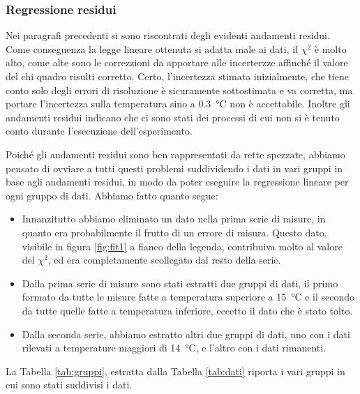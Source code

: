 \subsubsection{Regressione residui}

Nei paragrafi precedenti si sono riscontrati degli evidenti andamenti residui. Come conseguenza la legge lineare ottenuta
si adatta male ai dati, il $\chi^2$ è molto alto, come alte sono le correzzioni da apportare alle incerterzze affinché 
il valore del chi quadro risulti corretto. Certo, l'incertezza stimata inizialmente, che tiene conto solo degli errori di risoluzione
è sicuramente sottostimata e va corretta, ma portare l'incertezza sulla temperatura sino a \SI{0.3}{\celsius} non è accettabile.
Inoltre gli andamenti residui indicano che ci sono stati dei processi di cui non si è tenuto conto durante l'esecuzione dell'esperimento.

Poiché gli andamenti residui sono ben rappresentati da rette spezzate, abbiamo pensato di ovviare a tutti questi problemi suddividendo i
dati in vari gruppi in base agli andamenti residui, in modo da poter eseguire la regressione lineare per ogni gruppo di dati.
Abbiamo fatto quanto segue:

\label{sottoserie}
\begin{itemize}
    \item{Innanzitutto abbiamo eliminato un dato nella prima serie di misure, in quanto era probabilmente il frutto di un
        errore di misura. Questo dato, visibile in figura \ref{fig:fit1} a fianco della legenda,
        contribuiva molto al valore del $\chi^2$, ed era completamente scollegato dal resto della serie.}
    \item{Dalla prima serie di misure sono stati estratti due gruppi di dati, il primo formato da tutte le misure fatte
        a temperatura superiore a \SI{15}{\celsius} e il secondo da tutte quelle fatte a temperatura inferiore, eccetto
        il dato che è stato tolto.}
    \item{Dalla seconda serie, abbiamo estratto altri due gruppi di dati, uno con i dati rilevati a temperature maggiori di
        \SI{14}{\celsius}, e l'altro con i dati rimanenti.}
\end{itemize}

La Tabella \ref{tab:gruppi}, estratta dalla Tabella \ref{tab:dati} riporta i vari gruppi in cui sono stati suddivisi i dati.

